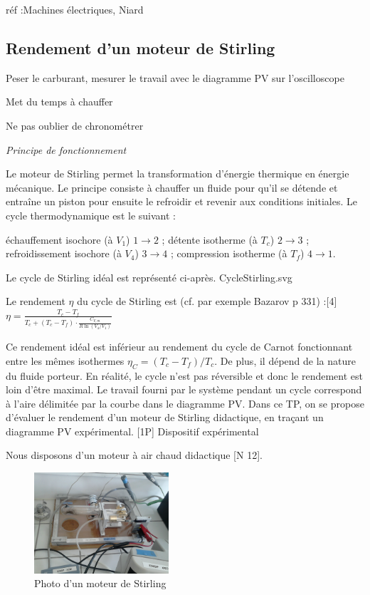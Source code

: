 \documentclass{article}%
\begin{document}
réf :Machines électriques, Niard
\subsection{Rendement d'un moteur de Stirling}
Peser le carburant, mesurer le travail avec le diagramme PV sur l'oscilloscope

Met du temps à chauffer

Ne pas oublier de chronométrer

\textit{Principe de fonctionnement}

Le moteur de Stirling permet la transformation d'énergie thermique en énergie mécanique. Le principe consiste à chauffer un fluide pour qu'il se détende et entraîne un piston pour ensuite le refroidir et revenir aux conditions initiales. Le cycle thermodynamique est le suivant :

    échauffement isochore (à $V_1$) $1 \rightarrow 2$ ;
    détente isotherme (à $T_c$) $2 \rightarrow 3$ ;
    refroidissement isochore (à $V_4$) $3 \rightarrow 4$ ;
    compression isotherme (à $T_f$) $4 \rightarrow 1$.

Le cycle de Stirling idéal est représenté ci-après.
CycleStirling.svg

Le rendement $\eta$ du cycle de Stirling est (cf. par exemple Bazarov p 331) :[4]
$\eta=\frac{T_c-T_f}{T_c+(T_c-T_f) \cdot \frac{C_{V,m}}{R \ln(V_4/V_1)}}$

Ce rendement idéal est inférieur au rendement du cycle de Carnot fonctionnant entre les mêmes isothermes $\eta_C=(T_c-T_f)/T_c$. De plus, il dépend de la nature du fluide porteur. En réalité, le cycle n'est pas réversible et donc le rendement est loin d'être maximal. Le travail fourni par le système pendant un cycle correspond à l'aire délimitée par la courbe dans le diagramme PV. Dans ce TP, on se propose d'évaluer le rendement d'un moteur de Stirling didactique, en traçant un diagramme PV expérimental.
[1P] Dispositif expérimental

Nous disposons d'un moteur à air chaud didactique [N 12].
\begin{figure}
	\centerline{\includegraphics[width=5cm]{images-exp/stirling.jpg}}
	\caption{Photo d'un moteur de Stirling}
\end{figure}
\end{document}
